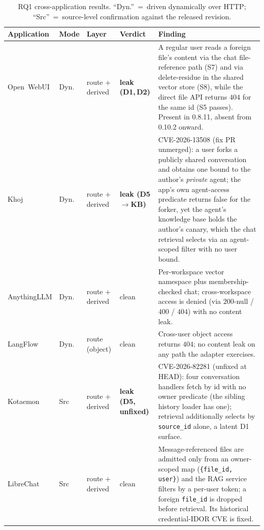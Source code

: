 \IfFileExists{IEEEtran.cls}{\documentclass[conference]{IEEEtran}}{\documentclass[10pt,twocolumn]{article}}
\newcommand{\code}[1]{\texttt{\small #1}}
\begin{document}
\begin{table}[t]\centering\footnotesize
\setlength{\tabcolsep}{4pt}
\caption{RQ1 cross-application results. ``Dyn.''~=~driven dynamically over HTTP; ``Src''~=~source-level confirmation against the released revision.}
\label{tab:ea1}
\begin{tabular}{llll p{9.2cm}}
\toprule
Application & Mode & Layer & Verdict & Finding \\
\midrule
Open~WebUI & Dyn. & route + derived & \textbf{leak (D1,\,D2)} & A regular user reads a foreign file's content via the chat file-reference path (S7) and via delete-residue in the shared vector store (S8), while the direct file API returns $404$ for the same id (S5 passes). Present in 0.8.11, absent from 0.10.2 onward. \\
Khoj & Dyn. & route + derived & \textbf{leak (D5$\rightarrow$KB)} & CVE-2026-13508 (fix PR unmerged): a user forks a publicly shared conversation and obtains one bound to the author's \emph{private} agent; the app's own agent-access predicate returns false for the forker, yet the agent's knowledge base holds the author's canary, which the chat retrieval selects via an agent-scoped filter with no user bound. \\
AnythingLLM & Dyn. & route + derived & clean & Per-workspace vector namespace plus membership-checked chat; cross-workspace access is denied (via $200$-null / $400$ / $404$) with no content leak. \\
LangFlow & Dyn. & route (object) & clean & Cross-user object access returns $404$; no content leak on any path the adapter exercises. \\
Kotaemon & Src & route + derived & \textbf{leak (D5, unfixed)} & CVE-2026-82281 (unfixed at HEAD): four conversation handlers fetch by id with no owner predicate (the sibling history loader has one); retrieval additionally selects by \code{source\_id} alone, a latent D1 surface. \\
LibreChat & Src & route + derived & clean & Message-referenced files are admitted only from an owner-scoped map (\code{\{file\_id, user\}}) and the RAG service filters by a per-user token; a foreign \code{file\_id} is dropped before retrieval. Its historical credential-IDOR CVE is fixed. \\
\bottomrule
\end{tabular}
\end{table}
\end{document}
